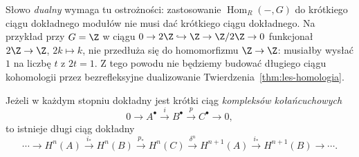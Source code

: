 Słowo \emph{dualny} wymaga tu ostrożności:
zastosowanie $\operatorname{Hom}_R(-,G)$
do krótkiego ciągu dokładnego modułów
nie musi dać krótkiego ciągu dokładnego.
Na przykład przy $G=\Z$ w ciągu
$0\to2\Z\hookrightarrow\Z\to\Z/2\Z\to0$
funkcjonał $2\Z\to\Z$, $2k\mapsto k$,
nie przedłuża się do homomorfizmu
$\Z\to\Z$: musiałby wysłać $1$
na liczbę $t$ z $2t=1$.
Z tego powodu nie będziemy budować
długiego ciągu kohomologii przez
bezrefleksyjne dualizowanie
Twierdzenia~\ref{thm:les-homologia}.

\begin{twierdzenie}
\label{thm:les-kohomologia}
Jeżeli w każdym stopniu dokładny jest
krótki ciąg \emph{kompleksów kołańcuchowych}
\[
 0\longrightarrow A^\bullet\xrightarrow{i}B^\bullet
 \xrightarrow{p}C^\bullet\longrightarrow0,
\]
to istnieje długi ciąg dokładny
\begin{equation}\label{eq:les-kohomologia}
 \cdots\longrightarrow H^n(A)
 \xrightarrow{i_*}H^n(B)
 \xrightarrow{p_*}H^n(C)
 \xrightarrow{\delta^n}H^{n+1}(A)
 \xrightarrow{i_*}H^{n+1}(B)\longrightarrow\cdots.
\end{equation}
\end{twierdzenie}
